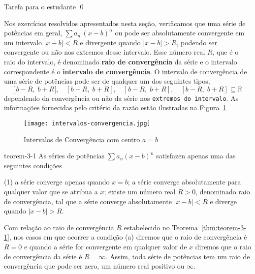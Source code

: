 \begin{prvc}{}{}
Tarefa para o estudante \hfill \qed  
\end{prvc} 


Nos exercícios resolvidos apresentados nesta seção, verificamos que uma série de potências em geral,
\(\sum a_{n}\,(x-b)^{n}\) 
ou pode ser absolutamente convergente em um intervalo \(|x-b| < R\) e divergente quando 
\(|x-b| > R\), podendo
ser convergente ou não nos extremos desse intervalo. Esse número real \(R\), que é o raio do intervalo, é
denominado \textbf{raio de convergência} da série e o intervalo correspondente é o 
\textbf{intervalo de convergência}. O intervalo de convergência de uma série de potências pode ser de 
qualquer um dos seguintes tipos,
\begin{equation*}
]b-R,\; b+R[,\quad  [b-R,\; b+R[,\quad  ]b-R,\; b+R],\quad  [b-R,\; b+R] \subseteq \mathbb{R}
\end{equation*}
dependendo da convergência ou não da série nos \texttt{extremos do intervalo}. As informações fornecidas pelo
critério da razão estão ilustradas na Figura~\ref{fig:3-1B}
\begin{figure}[H]
\centering
\texttt{[image: intervalos-convergencia.jpg]}
\caption{Intervalos de Convergência com centro \(a=b\)}
\label{fig:3-1B}
\end{figure}


\begin{theoc}{}{teorem-3-1}
As séries de potências \(\sum a_{n}(x-b)^{n}\) satisfazen apenas uma das seguintes condições
\begin{tasks}[label=(\alph*),item-indent=1.5cm, label-width=2em,ref=(\alph*)](1)
  \task a série converge apenas quando \(x=b\);
  \task a série converge absolutamente para qualquer valor que se atribua a \(x\);
  \task existe um número real \(R > 0\), denominado raio de convergência, tal que a série converge 
  absolutamente \(|x-b|<R\) e diverge quando \(|x-b| > R\).
\end{tasks}
\end{theoc}

Com relação ao raio de convergência \(R\) estabelecido no Teorema~\ref{thm:teorem-3-1}, nos casos em que 
ocorrer a condição (a) diremos que o raio de convergência é \(R = 0\) e quando a série for convergente em 
qualquer valor de \(x\) diremos que o raio de convergência da série é \(R = \infty\). Assim, toda série de 
potências tem um raio de convergência que pode ser zero, um número real positivo ou \(\infty\). 

